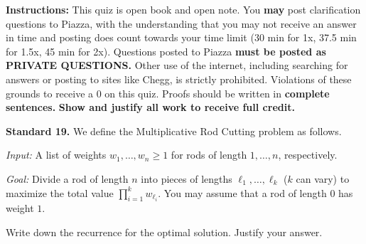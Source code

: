 \documentclass[11pt]{article}
\begin{document}
\renewcommand{\headrulewidth}{0.5pt}

\phantom{Test}

\begin{small}
\noindent \textbf{Instructions:} This quiz is open book and open note. You \textbf{may} post clarification questions to Piazza, with the understanding that you may not receive an answer in time and posting does count towards your time limit (30 min for 1x, 37.5 min for 1.5x, 45 min for 2x). Questions posted to Piazza \textbf{must be posted as PRIVATE QUESTIONS.} Other use of the internet, including searching for answers or posting to sites like Chegg, is strictly prohibited. Violations of these grounds to receive a 0 on this quiz. Proofs should be written in \textbf{complete sentences.} \textbf{Show and justify all work to receive full credit.}
\end{small} 

\hrulefill 

\noindent  \textbf{Standard 19.} We define the \textsf{Multiplicative Rod Cutting} problem as follows.

\textit{Input:} A list of weights $w_1, \dotsc, w_n \geq 1$ for rods of length $1, \dotsc, n$, respectively. 

\textit{Goal:} Divide a rod of length $n$ into pieces of lengths $\ell_1, \dotsc, \ell_k$ ($k$ can vary) to maximize the total value $\prod_{i=1}^{k} w_{\ell_i}$. You may assume that a rod of length $0$ has weight $1$.

\noindent Write down the recurrence for the optimal solution. Justify your answer.
\end{document}
